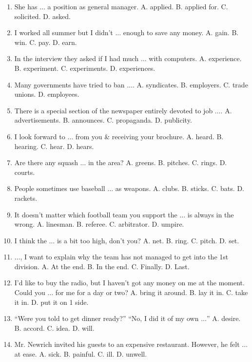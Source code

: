 \documentclass{article}
\numberwithin{equation}{section}
\begin{document}
\begin{enumerate}[leftmargin=8mm]
	\item She has $\ldots$ a position as general manager. {\sf A.} applied. {\sf B.} applied for. {\sf C.} solicited. {\sf D.} asked.
	\item I worked all summer but I didn't $\ldots$ enough to save any money. {\sf A.} gain. {\sf B.} win. {\sf C.} pay. {\sf D.} earn.
	\item In the interview they asked if I had much $\ldots$ with computers. {\sf A.} experience. {\sf B.} experiment. {\sf C.} experiments. {\sf D.} experiences.
	\item Many governments have tried to ban $\ldots$. {\sf A.} syndicates. {\sf B.} employers. {\sf C.} trade unions. {\sf D.} employees.
	\item There is a special section of the newspaper entirely devoted to job $\ldots$. {\sf A.} advertisements. {\sf B.} announces. {\sf C.} propaganda. {\sf D.} publicity.
	\item I look forward to $\ldots$ from you \& receiving your brochure. {\sf A.} heard. {\sf B.} hearing. {\sf C.} hear. {\sf D.} hears.
	\item Are there any squash $\ldots$ in the area? {\sf A.} greens. {\sf B.} pitches. {\sf C.} rings. {\sf D.} courts.
	\item People sometimes use baseball $\ldots$ as weapons. {\sf A.} clubs. {\sf B.} sticks. {\sf C.} bats. {\sf D.} rackets.
	\item It doesn't matter which football team you support the $\ldots$ is always in the wrong. {\sf A.} linesman. {\sf B.} referee. {\sf C.} arbitrator. {\sf D.} umpire.
	\item I think the $\ldots$ is a bit too high, don't you? {\sf A.} net. {\sf B.} ring. {\sf C.} pitch. {\sf D.} set.
	\item $\ldots$, I want to explain why the team has not managed to get into the 1st division. {\sf A.} At the end. {\sf B.} In the end. {\sf C.} Finally. {\sf D.} Last.
	\item I'd like to buy the radio, but I haven't got any money on me at the moment. Could you $\ldots$ for me for a day or two? {\sf A.} bring it around. {\sf B.} lay it in. {\sf C.} take it in. {\sf D.} put it on 1 side.
	\item ``Were you told to get dinner ready?'' ``No, I did it of my own $\ldots$'' {\sf A.} desire. {\sf B.} accord. {\sf C.} idea. {\sf D.} will.
	\item Mr. Newrich invited his guests to an expensive restaurant. However, he felt $\ldots$ at ease. {\sf A.} sick. {\sf B.} painful. {\sf C.} ill. {\sf D.} unwell.

\end{enumerate}
\end{document}
